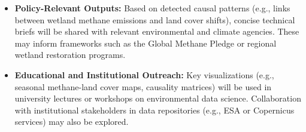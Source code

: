 \begin{itemize}
	\item \textbf{Policy-Relevant Outputs:} Based on detected causal patterns (e.g., links between wetland methane emissions and land cover shifts), concise technical briefs will be shared with relevant environmental and climate agencies. These may inform frameworks such as the Global Methane Pledge or regional wetland restoration programs.

	\item \textbf{Educational and Institutional Outreach:} Key visualizations (e.g., seasonal methane-land cover maps, causality matrices) will be used in university lectures or workshops on environmental data science. Collaboration with institutional stakeholders in data repositories (e.g., ESA or Copernicus services) may also be explored.
\end{itemize}

